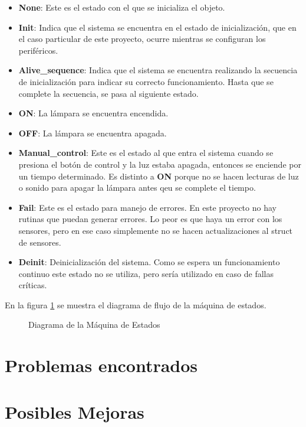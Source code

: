 \begin{itemize}
\item \textbf{None}: Este es el estado con el que se inicializa el objeto. 
\item \textbf{Init}: Indica que el sistema se encuentra en el estado de inicialización, que en el
  caso particular de este proyecto, ocurre mientras se configuran los periféricos.
\item \textbf{Alive\_sequence}: Indica que el sistema se encuentra realizando la secuencia de
  inicialización para indicar su correcto funcionamiento. Hasta que se complete la secuencia, se
  pasa al siguiente estado. 
\item \textbf{ON}: La lámpara se encuentra encendida.
\item \textbf{OFF}: La lámpara se encuentra apagada.
\item \textbf{Manual\_control}: Este es el estado al que entra el sistema cuando se presiona el
  botón de control y la luz estaba apagada, entonces se enciende por un tiempo determinado. Es
  distinto a \textbf{ON} porque no se hacen lecturas de luz o sonido para apagar la lámpara antes
  qeu se complete el tiempo.
\item \textbf{Fail}: Este es el estado para manejo de errores. En este proyecto no hay rutinas que
  puedan generar errores. Lo peor es que haya un error con los sensores, pero en ese caso simplemente
  no se hacen actualizaciones al struct de sensores. 
\item \textbf{Deinit}: Deinicialización del sistema. Como se espera un funcionamiento continuo este
  estado no se utiliza, pero sería utilizado en caso de fallas críticas. 
\end{itemize}

En la figura \ref{fig:state_machine} se muestra el diagrama de flujo de la máquina de estados. 

\begin{figure}
\centering
\scalebox{.4}{}
\caption{Diagrama de la Máquina de Estados}
\label{fig:state_machine}
\end{figure}



\newpage
\section{Problemas encontrados}


\newpage
\section{Posibles Mejoras}


\newpage


%
%
